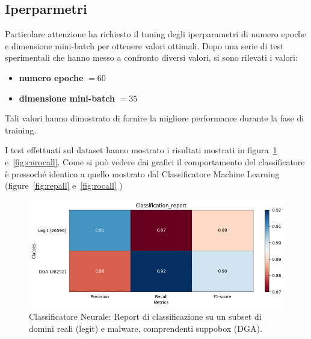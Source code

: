 \newpage
\subsection{Iperparmetri}
Particolare attenzione ha richiesto il tuning degli iperparametri di numero epoche e dimensione mini-batch per ottenere valori ottimali. Dopo una serie di test sperimentali che hanno messo a confronto diversi valori, si sono rilevati i valori:

\begin{itemize}
\item \textbf{numero epoche} $= 60$
\item \textbf{dimensione mini-batch} $= 35$ 
\end{itemize}

Tali valori hanno dimostrato di fornire la migliore performance durante la fase di training.

I test effettuati sul dataset hanno mostrato i risultati mostrati in figura~\ref{fig:cnrepall} e~\ref{fig:cnrocall}. Come si può vedere dai grafici il comportamento del classificatore è pressoché identico a quello mostrato dal Classificatore Machine Learning (figure~\ref{fig:repall} e~\ref{fig:rocall} )

\begin{figure}[!bp]
    \centering
    \includegraphics[width=\columnwidth]{figures/clas_nn/class_rep.png}
    \caption{Classificatore Neurale: Report di classificazione su un subset di domini reali (legit) e malware, comprendenti suppobox (DGA).\label{fig:cnrepall}}
\end{figure}

